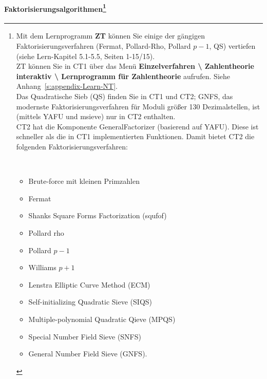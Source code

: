 \begin{refsegment}
\paragraph*{Faktorisierungsalgorithmen\footnote{%
    Mit dem Lernprogramm \textbf{ZT} können Sie einige der gängigen
    Faktorisierungsverfahren (Fermat, Pollard-Rho, Pollard $p-1$, QS) vertiefen
    (siehe Lern-Kapitel 5.1-5.5, Seiten 1-15/15).\\
    ZT können Sie in CT1 über das Menü
    \textbf{Einzelverfahren \textbackslash{} Zahlentheorie
    interaktiv \textbackslash{} Lernprogramm für Zahlentheorie} aufrufen.
    Siehe Anhang~\ref{s:appendix-Learn-NT}.\\
     Das Quadratische Sieb (QS) finden Sie in CT1 und CT2;
    GNFS, das modernste Faktorisierungsverfahren für Moduli größer 130
    Dezimalstellen, ist (mittels YAFU und msieve) nur in CT2 enthalten.\\
   CT2 hat die Komponente GeneralFactorizer
  (basierend auf YAFU). Diese ist schneller als die in CT1
  implementierten Funktionen.
  Damit bietet CT2 die folgenden Faktorisierungsverfahren:
\strut\\[-1.5\baselineskip]
\begin{multicols}{2}
  \begin{itemize}[nosep,label=-]
   \item Brute-force mit kleinen Primzahlen
   \item Fermat
   \item Shanks Square Forms Factorization (squfof)
   \item Pollard rho
   \item Pollard $p-1$
   \item Williams $p+1$
   \item Lenstra Elliptic Curve Method (ECM)
   \item Self-initializing Quadratic Sieve (SIQS)
   \item Multiple-polynomial Quadratic Qieve (MPQS)
   \item Special Number Field Sieve (SNFS)
   \item General Number Field Sieve (GNFS).
  \end{itemize}
\end{multicols}
}}
\mbox{}%


\end{refsegment}
